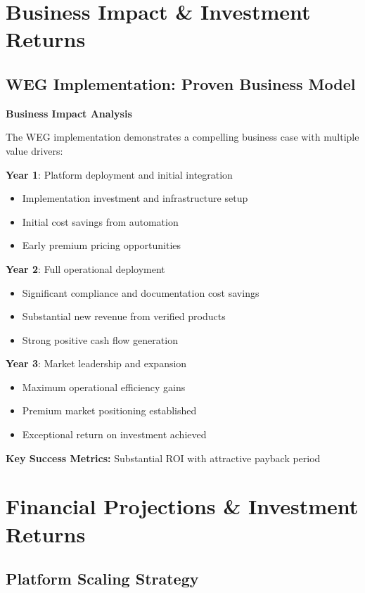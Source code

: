 \documentclass[11pt,a4paper]{article}
\begin{document}
\section{Business Impact \& Investment Returns}

\subsection{WEG Implementation: Proven Business Model}

\textbf{Business Impact Analysis}

The WEG implementation demonstrates a compelling business case with multiple value drivers:

\textbf{Year 1}: Platform deployment and initial integration
\begin{itemize}[leftmargin=0.5cm]
    \item Implementation investment and infrastructure setup
    \item Initial cost savings from automation
    \item Early premium pricing opportunities
\end{itemize}

\textbf{Year 2}: Full operational deployment  
\begin{itemize}[leftmargin=0.5cm]
    \item Significant compliance and documentation cost savings
    \item Substantial new revenue from verified products
    \item Strong positive cash flow generation
\end{itemize}

\textbf{Year 3}: Market leadership and expansion
\begin{itemize}[leftmargin=0.5cm]
    \item Maximum operational efficiency gains
    \item Premium market positioning established
    \item Exceptional return on investment achieved
\end{itemize}

\textbf{Key Success Metrics:} Substantial ROI with attractive payback period

\section{Financial Projections \& Investment Returns}

\subsection{Platform Scaling Strategy}
\end{document}
